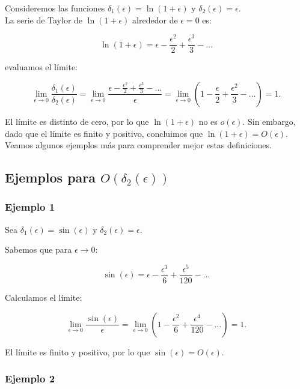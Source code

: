 \documentclass[12pt, a4paper]{report}
\begin{document}
Consideremos las funciones $\delta_1\left(\epsilon\right)=\ln\left(1+\epsilon\right)$ y $\delta_2\left(\epsilon\right)=\epsilon$.\\

La serie de Taylor de $\ln\left(1+\epsilon\right)$ alrededor de $\epsilon=0$ es:

$$\ln\left(1+\epsilon\right)=\epsilon-\frac{\epsilon^2}{2}+\frac{\epsilon^3}{3}-\dots$$

evaluamos el límite:

$$\lim_{\epsilon\to0}\frac{\delta_1\left(\epsilon\right)}{\delta_2\left(\epsilon\right)}=\lim_{\epsilon\to0}\frac{\epsilon-\frac{\epsilon^2}{2}+\frac{\epsilon^3}{3}-\dots}{\epsilon}=\lim_{\epsilon\to0}\left(1-\frac{\epsilon}{2}+\frac{\epsilon^2}{3}-\dots\right)=1.$$

El límite es distinto de cero, por lo que $\ln\left(1+\epsilon\right)$ no es $o\left(\epsilon\right)$. Sin embargo, dado que el límite es finito y positivo, concluimos que $\ln\left(1+\epsilon\right)=O\left(\epsilon\right)$.\\


Veamos algunos ejemplos más para comprender mejor estas definiciones.

\subsection*{Ejemplos para \( O\left( \delta_2(\epsilon) \right) \)}

\subsubsection*{Ejemplo 1}

Sea \(\delta_1(\epsilon) = \sin(\epsilon)\) y \(\delta_2(\epsilon) = \epsilon\).

Sabemos que para \(\epsilon \to 0\):

\[
\sin(\epsilon) = \epsilon - \frac{\epsilon^3}{6} + \frac{\epsilon^5}{120} - \dots
\]

Calculamos el límite:

\[
\lim_{\epsilon \to 0} \frac{\sin(\epsilon)}{\epsilon} = \lim_{\epsilon \to 0} \left(1 - \frac{\epsilon^2}{6} + \frac{\epsilon^4}{120} - \dots \right) = 1.
\]

El límite es finito y positivo, por lo que \(\sin(\epsilon) = O\left( \epsilon \right)\).

\subsubsection*{Ejemplo 2}
\end{document}

